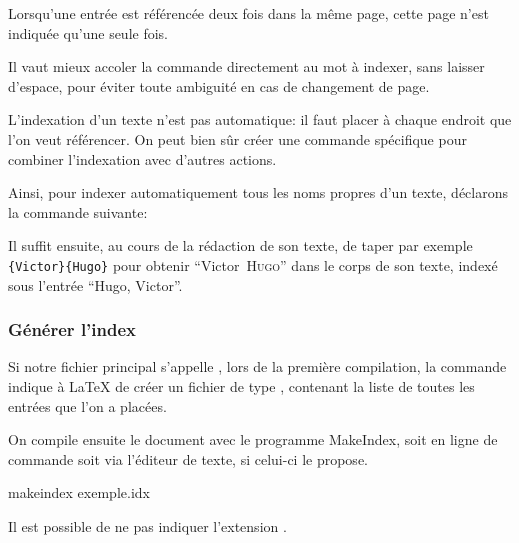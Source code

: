  Lorsqu'une entrée est référencée deux fois dans la même page, cette page n'est indiquée qu'une seule fois. 

\begin{attention}
Il vaut mieux accoler la commande  directement au  mot à indexer, sans laisser d'espace, pour éviter toute ambiguité en cas de changement de page.

\end{attention}


L'indexation d'un texte n'est pas automatique: il faut placer  à chaque endroit  que l'on veut référencer. On  peut bien sûr créer une commande  spécifique pour combiner l'indexation avec d'autres actions.

Ainsi, pour indexer automatiquement tous les noms propres d'un texte, déclarons la commande suivante:\label{indexauteur}

\begin{latexcode}
\newcommand\auteur[2]{#1~\textsc{#2}\index{#2, #1}\xspace}
\end{latexcode}

\renewcommand\auteur[2]{#1~\textsc{#2}\xspace}

Il suffit ensuite, au cours de la rédaction de son texte, de taper par exemple \verb|{Victor}{Hugo}| pour obtenir \enquote{\auteur{Victor}{Hugo}} dans le corps de son texte, indexé sous l'entrée \enquote{Hugo, Victor}.


\subsubsection{Générer l'index}

Si notre fichier principal s'appelle , lors de la première compilation, la commande  indique à \LaTeX{} de créer un fichier de type , contenant la liste de toutes les entrées que l'on a placées. 
 




On compile ensuite le document avec le programme MakeIndex, soit  en ligne de commande  soit via l'éditeur de texte, si celui-ci le propose.

\begin{bashcode}
makeindex exemple.idx
\end{bashcode}

Il est possible de ne pas indiquer l'extension .

